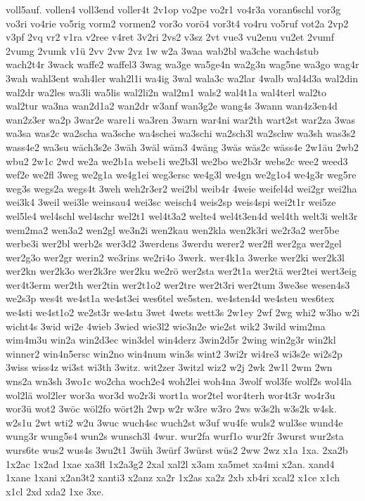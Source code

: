 {voll5auf.
vollen4
voll3end
voller4t
2v1op
vo2pe
vo2r1
vo4r3a
voran6schl
vor3g
vo3ri
vo4rie
vo5rig
vorm2
vormen2
vor3o
vorö4
vor3t4
vo4ru
vo5ruf
vot2a
2vp2
v3pf
2vq
vr2
v1ra
v2ree
v4ret
3v2ri
2vs2
v3sz
2vt
vue3
vu2enu
vu2et
2vumf
2vumg
2vumk
v1ü
2vv
2vw
2vz
1w
w2a
3waa
wab2bl
wa3che
wach4stub
wach2t4r
3wack
waffe2
waffel3
3wag
wa3ge
wa5ge4n
wa2g3n
wag5ne
wa3go
wag4r
3wah
wahl3ent
wah4ler
wah2l1i
wa4ig
3wal
wala3c
wa2lar
4walb
wal4d3a
wal2din
wal2dr
wa2les
wa3li
wa5lis
wal2li2n
wal2m1
wals2
wal4t1a
wal4terl
wal2to
wal2tur
wa3na
wan2d1a2
wan2dr
w3anf
wan3g2e
wang4s
3wann
wan4z3en4d
wan2z3er
wa2p
3war2e
ware1i
wa3ren
3warn
war4ni
war2th
wart2st
war2za
3was
wa3sa
was2c
wa2scha
wa3sche
wa4schei
wa3schi
wa2sch3l
wa2schw
wa3sh
was3s2
wass4e2
wa3su
wäch3s2e
3wäh
3wäl
wäm3
4wäng
3wäs
wäs2c
wäss4e
2w1äu
2wb2
wbu2
2w1c
2wd
we2a
we2b1a
webe1i
we2b3l
we2bo
we2b3r
webs2c
wee2
weed3
wef2e
we2fl
3weg
we2g1a
we4g1ei
weg3ersc
we4g3l
we4gn
we2g1o4
we4g3r
weg5re
weg3s
wegs2a
wegs4t
3weh
weh2r3er2
wei2bl
weib4r
4weie
weifel4d
wei2gr
wei2ha
wei3k4
3weil
wei3le
weinsau4
wei3sc
weisch4
weis2sp
weis4spi
wei2t1r
wei5ze
wel5le4
wel4schl
wel4schr
wel2t1
wel4t3a2
welte4
wel4t3en4d
wel4th
welt3i
welt3r
wem2ma2
wen3a2
wen2gl
we3n2i
wen2kau
wen2kla
wen2k3ri
we2r3a2
wer5be
werbe3i
wer2bl
werb2s
wer3d2
3werdens
3werdu
werer2
wer2fl
wer2ga
wer2gel
wer2g3o
wer2gr
werin2
we3rins
we2ri4o
3werk.
wer4k1a
3werke
wer2ki
wer2k3l
wer2kn
wer2k3o
wer2k3re
wer2ku
we2rö
wer2sta
wer2t1a
wer2tä
wer2tei
wert3eig
wer4t3erm
wer2th
wer2tin
wer2t1o2
wer2tre
wer2t3ri
wer2tum
3we3se
wesen4s3
we2s3p
wes4t
we4st1a
we4st3ei
wes6tel
we5sten.
we4sten4d
we4steu
wes6tex
we4sti
we4st1o2
we2st3r
we4stu
3wet
4wets
wett3s
2w1ey
2wf
2wg
whi2
w3ho
w2i
wicht4s
3wid
wi2e
4wieb
3wied
wie3l2
wie3n2e
wie2st
wik2
3wild
wim2ma
wim4m3u
win2a
win2d3ec
win3del
win4derz
3win2d5r
2wing
win2g3r
win2kl
winner2
win4n5ersc
win2no
win4num
win3s
wint2
3wi2r
wi4re3
wi3s2e
wi2s2p
3wiss
wiss4z
wi3st
wi3th
3witz.
wit2zer
3witzl
wiz2
w2j
2wk
2w1l
2wm
2wn
wns2a
wn3sh
3wo1c
wo2cha
woch2e4
woh2lei
woh4na
3wolf
wol3fe
wolf2s
wol4la
wol2lä
wol2ler
wor3a
wor3d
wo2r3i
wort1a
wor2tel
wor4terh
wor4t3r
wo4r3u
wor3ü
wot2
3wöc
wöl2fo
wört2h
2wp
w2r
w3re
w3ro
2ws
w3s2h
w3s2k
w4sk.
w2s1u
2wt
wti2
w2u
3wuc
wuch4sc
wuch2st
w3uf
wu4fe
wuls2
wul3se
wund4e
wung3r
wung5s4
wun2s
wunsch3l
4wur.
wur2fa
wurf1o
wur2fr
3wurst
wur2sta
wurs6te
wus2
wus4s
3wu2t1
3wüh
3würf
3würst
wüs2
2ww
2wz
x1a
1xa.
2xa2b
1x2ac
1x2ad
1xae
xa3fl
1x2a3g2
2xal
xal2l
x3am
xa5met
xa4mi
x2an.
xand4
1xane
1xani
x2an3t2
xanti3
x2anz
xa2r
1x2as
xa2z
2xb
xb4ri
xcal2
x1ce
x1ch
x1cl
2xd
xda2
1xe
3xe.
}
